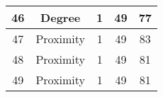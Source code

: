 \documentclass[results.tex]{subfiles}
\begin{document}
\begin{center}
\begin{tabular}{| c || c | c | c | c |}
            \hline
            46                      & Degree                       & 1                      & 49                      & 77                   \\
            \hline
            47                      & Proximity                    & 1                      & 49                      & 83                   \\
            \hline
            48                      & Proximity                    & 1                      & 49                      & 81                   \\
            \hline
            49                      & Proximity                    & 1                      & 49                      & 81                   \\
            \hline
        \end{tabular}
    \end{center}
\end{document}
